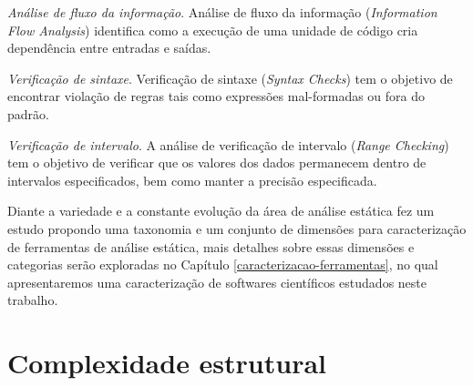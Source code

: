\begin{description}
  \item \textit{Análise de fluxo da informação}.
    Análise de fluxo da informação ({\it Information Flow Analysis}) identifica
    como a execução de uma unidade de código cria dependência entre entradas e
    saídas.

  \item \textit{Verificação de sintaxe}.
    Verificação de sintaxe ({\it Syntax Checks}) tem o objetivo de encontrar
    violação de regras tais como expressões mal-formadas ou fora do padrão.

  \item \textit{Verificação de intervalo}.
    A análise de verificação de intervalo ({\it Range Checking}) tem o objetivo
    de verificar que os valores dos dados permanecem dentro de intervalos
    especificados, bem como manter a precisão especificada.

\end{description}

Diante a variedade e a constante evolução da área de análise estática
 fez um estudo propondo uma taxonomia e um conjunto de
dimensões para caracterização de ferramentas de análise estática, mais detalhes
sobre essas dimensões e categorias serão exploradas no Capítulo
\ref{caracterizacao-ferramentas}, no qual apresentaremos uma caracterização de
softwares científicos estudados neste trabalho.

\section{Complexidade estrutural} \label{complexidade}

